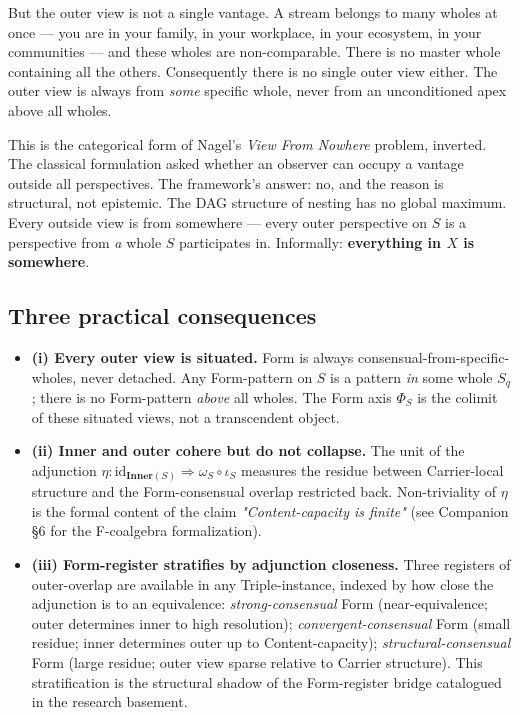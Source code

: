 \documentclass[11pt, openany]{book}
\begin{document}
But the outer view is not a single vantage. A stream belongs to many wholes at once --- you are in your family, in your workplace, in your ecosystem, in your communities --- and these wholes are non-comparable. There is no master whole containing all the others. Consequently there is no single outer view either. The outer view is always from \textit{some} specific whole, never from an unconditioned apex above all wholes.

This is the categorical form of Nagel's \textit{View From Nowhere} problem, inverted. The classical formulation asked whether an observer can occupy a vantage outside all perspectives. The framework's answer: no, and the reason is structural, not epistemic. The DAG structure of nesting has no global maximum. Every outside view is from somewhere --- every outer perspective on $S$ is a perspective from \textit{a} whole $S$ participates in. Informally: \textbf{everything in $X$ is somewhere}.

\subsection{Three practical consequences}

\begin{itemize}
\item \textbf{(i) Every outer view is situated.} Form is always consensual-from-specific-wholes, never detached. Any Form-pattern on $S$ is a pattern \textit{in} some whole $S_q$; there is no Form-pattern \textit{above} all wholes. The Form axis $\Phi_S$ is the colimit of these situated views, not a transcendent object.

\item \textbf{(ii) Inner and outer cohere but do not collapse.} The unit of the adjunction $\eta: \text{id}_{\mathbf{Inner}(S)} \Rightarrow \omega_S \circ \iota_S$ measures the residue between Carrier-local structure and the Form-consensual overlap restricted back. Non-triviality of $\eta$ is the formal content of the claim \textit{"Content-capacity is finite"} (see Companion §6 for the F-coalgebra formalization).

\item \textbf{(iii) Form-register stratifies by adjunction closeness.} Three registers of outer-overlap are available in any Triple-instance, indexed by how close the adjunction is to an equivalence: \textit{strong-consensual} Form (near-equivalence; outer determines inner to high resolution); \textit{convergent-consensual} Form (small residue; inner determines outer up to Content-capacity); \textit{structural-consensual} Form (large residue; outer view sparse relative to Carrier structure). This stratification is the structural shadow of the Form-register bridge catalogued in the research basement.
\end{itemize}
\end{document}
